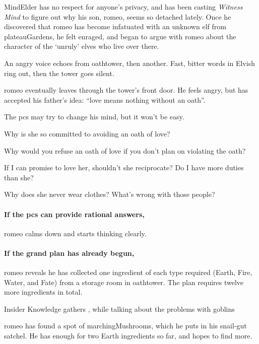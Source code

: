 \begin{multicols}{2}
\Gls{MindElder} has no respect for anyone's privacy, and has been \gls{casting} \textit{Witness Mind} to figure out why his son, \gls{romeo}, seems so detached lately.
Once he discovered that \gls{romeo} has become infatuated with an unknown elf from \gls{plateauGardens}, he felt enraged, and began to argue with \gls{romeo} about the character of the `unruly' elves who live over there.

\begin{boxtext}
  An angry voice echoes from \gls{oathtower}, then another.
  Fast, bitter words in Elvish ring out, then the tower goes silent.
\end{boxtext}

\Gls{romeo} eventually leaves through the tower's front door.
He feels angry, but has accepted his father's idea: ``love means nothing without an oath''.

The \glspl{pc} may try to change his mind, but it won't be easy.

\begin{speechtext}
  Why is she so committed to avoiding an oath of love?

  Why would you refuse an oath of love if you don't plan on violating the oath?

  If I can promise to love her, shouldn't she reciprocate?
  Do I have more duties than she?

  Why does she never wear clothes?
  What's wrong with those people?
\end{speechtext}

\paragraph{If the \glspl{pc} can provide rational answers,}
\gls{romeo} calms down and starts thinking clearly.

\paragraph{If the grand plan has already begun,}
\Gls{romeo} reveals he has collected one \gls{ingredient} of each type required (Earth, Fire, Water, and Fate) from a storage room in \gls{oathtower}.
The plan requires twelve more \glspl{ingredient} in total.

{Insider Knowledge}%
{ gathers , while talking about the problems with goblins}%

\Gls{romeo} has found a spot of \glspl{marchingMushroom}, which he puts in his snail-gut satchel.
He has enough for two Earth \glspl{ingredient} so far, and hopes to find more.


\end{multicols}
